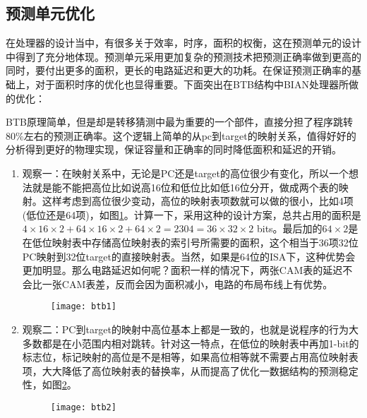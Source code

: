 \subsection{预测单元优化}
在处理器的设计当中，有很多关于效率，时序，面积的权衡，这在预测单元的设计中得到了充分地体现。预测单元采用更加复杂的预测技术把预测正确率做到更高的同时，要付出更多的面积，更长的电路延迟和更大的功耗。在保证预测正确率的基础上，对于面积时序的优化也显得重要。下面突出在BTB结构中BIAN处理器所做的优化：

BTB原理简单，但是却是转移猜测中最为重要的一个部件，直接分担了程序跳转80\%左右的预测正确率。这个逻辑上简单的从pc到target的映射关系，值得好好的分析得到更好的物理实现，保证容量和正确率的同时降低面积和延迟的开销。
\begin{enumerate}
	\item 观察一：在映射关系中，无论是PC还是target的高位很少有变化，所以一个想法就是能不能把高位比如说高16位和低位比如低16位分开，做成两个表的映射。这样考虑到高位很少变动，高位的映射表项数就可以做的很小，比如4项(低位还是64项)，如图\ref{fig:btb_opt1}。计算一下，采用这种的设计方案，总共占用的面积是$ 4\times16\times2 + 64\times16\times2 + 64\times2 = 2304 = 36\times 32\times 2 $ bits。最后加的$ 64\times2 $是在低位映射表中存储高位映射表的索引号所需要的面积，这个相当于36项32位PC映射到32位target的直接映射表。当然，如果是64位的ISA下，这种优势会更加明显。那么电路延迟如何呢？面积一样的情况下，两张CAM表的延迟不会比一张CAM表差，反而会因为面积减小，电路的布局布线上有优势。
	\begin{figure}[!htbp]
		\centering
		\texttt{[image: btb1]}
		\label{fig:btb_opt1}
	\end{figure}	
	\item 观察二：PC到target的映射中高位基本上都是一致的，也就是说程序的行为大多数都是在小范围内相对跳转。针对这一特点，在低位的映射表中再加1-bit的标志位，标记映射的高位是不是相等，如果高位相等就不需要占用高位映射表项，大大降低了高位映射表的替换率，从而提高了优化一数据结构的预测稳定性，如图\ref{fig:btb_opt2}。
	\begin{figure}[!htbp]
		\centering
		\texttt{[image: btb2]}
		\label{fig:btb_opt2}
	\end{figure}
\end{enumerate}

